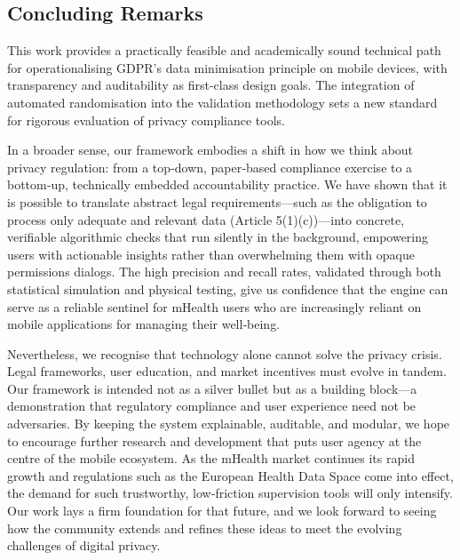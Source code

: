 \subsection{Concluding Remarks}
This work provides a practically feasible and academically sound technical path for operationalising GDPR's data minimisation principle on mobile devices, with transparency and auditability as first-class design goals. The integration of automated randomisation into the validation methodology sets a new standard for rigorous evaluation of privacy compliance tools.

In a broader sense, our framework embodies a shift in how we think about privacy regulation: from a top‑down, paper‑based compliance exercise to a bottom‑up, technically embedded accountability practice. We have shown that it is possible to translate abstract legal requirements—such as the obligation to process only adequate and relevant data (Article 5(1)(c))—into concrete, verifiable algorithmic checks that run silently in the background, empowering users with actionable insights rather than overwhelming them with opaque permissions dialogs. The high precision and recall rates, validated through both statistical simulation and physical testing, give us confidence that the engine can serve as a reliable sentinel for mHealth users who are increasingly reliant on mobile applications for managing their well‑being.

Nevertheless, we recognise that technology alone cannot solve the privacy crisis. Legal frameworks, user education, and market incentives must evolve in tandem. Our framework is intended not as a silver bullet but as a building block—a demonstration that regulatory compliance and user experience need not be adversaries. By keeping the system explainable, auditable, and modular, we hope to encourage further research and development that puts user agency at the centre of the mobile ecosystem. As the mHealth market continues its rapid growth \cite{3} and regulations such as the European Health Data Space \cite{19} come into effect, the demand for such trustworthy, low‑friction supervision tools will only intensify. Our work lays a firm foundation for that future, and we look forward to seeing how the community extends and refines these ideas to meet the evolving challenges of digital privacy.